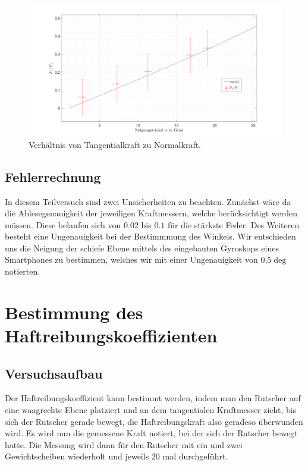 \documentclass{article}
\begin{document}
\begin{figure}[hbt!]
\centering
\includegraphics[width=470pt]{zerplot3.png}
\caption{Verhältnis von Tangentialkraft zu Normalkraft.}
\label{fig:length_eight_mouse}
\end{figure}
\subsection{Fehlerrechnung}
In diesem Teilversuch sind zwei Unsicherheiten zu beachten. Zunächst wäre da die Ablesegenauigkeit der jeweiligen Kraftmessern, welche berücksichtigt werden müssen. Diese belaufen sich von $0.02$ bis $0.1$ für die stärkste Feder. Des Weiteren besteht eine Ungenauigkeit bei der Bestimmmung des Winkels. Wir entschieden uns die Neigung der schiefe Ebene mittels des eingebauten Gyroskops eines Smartphones zu bestimmen, welches wir mit einer Ungenauigkeit von 0,5$\deg$ notierten.
\section{Bestimmung des Haftreibungskoeffizienten}
\subsection{Versuchsaufbau}
Der Haftreibungskoeffizient kann bestimmt werden, indem man den Rutscher auf eine waagrechte Ebene
platziert und an dem tangentialen Kraftmesser zieht, bis sich der Rutscher gerade bewegt, die
Haftreibungskraft also geradeso überwunden wird. Es wird nun die gemessene Kraft notiert, bei der sich der Rutscher bewegt hatte. Die Messung wird dann für den Rutscher mit ein und zwei Gewichtscheiben wiederholt und jeweils 20 mal durchgeführt.
\end{document}
